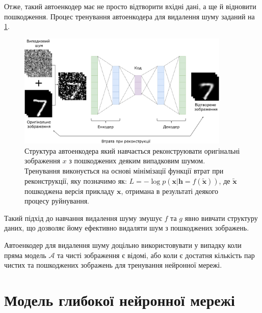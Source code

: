 \documentclass[14pt,a4paper]{extarticle}
\newcounter{e}
\numberwithin{equation}{section}
\numberwithin{figure}{section}
\begin{document}
	Отже, такий автоенкодер має не просто відтворити вхідні дані, а ще й відновити пошкодження. Процес тренування автоенкодера для видалення шуму заданий на \ref{fig:dae-graph}.
	\begin{figure}[h]
		\centering
		\includegraphics[width=0.9\textwidth]{../resources/dae.pdf}
		\caption{
			Структура автоенкодера який навчається реконструювати оригінальні зображення $x$ з пошкоджених деяким випадковим шумом. Тренування виконується на основі мінімізації функції втрат при реконструкції, яку позначимо як: $L = - \log p (\boldsymbol {x} | \boldsymbol {h} = f (\tilde {\boldsymbol {x}}))$, де $\tilde {\boldsymbol {x}}$ пошкоджена версія прикладу $\boldsymbol {x}$, отримана в результаті деякого процесу руйнування.
		}
		\label{fig:dae-graph}
	\end{figure}
	Такий підхід до навчання видалення шуму змушує $f$ та $g$ явно вивчати структуру даних, що дозволяє йому ефективно видаляти шум з пошкоджених зображень.
	
	Автоенкодер для видалення шуму доцільно використовувати у випадку коли пряма модель $\mathcal{A}$ та чисті зображення є відомі, або коли є достатня кількість пар чистих та пошкоджених зображень для тренування нейронної мережі. 
		
	\newpage
	\thispagestyle{empty}
	\section{Модель глибокої нейронної мережі}
\end{document}
